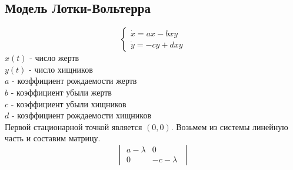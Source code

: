 \subsection{Модель Лотки-Вольтерра}
\begin{equation}
  \begin{cases}
    \dot{x}=ax-bxy\\
    \dot{y}=-cy+dxy
  \end{cases}
\end{equation}
$x(t)$ - число жертв\\
$y(t)$ - число хищников\\
$a$ - коэффициент рождаемости жертв\\
$b$ - коэффициент убыли жертв\\
$c$ - коэффициент убыли хищников \\
$d$ - коэффициент рождаемости хищников\\

Первой стационарной точкой является $(0,0)$. Возьмем из системы линейную часть и составим матрицу.
\begin{equation}
  \begin{vmatrix}
  a-\lambda&0\\0&-c-\lambda\;
\end{vmatrix}
\end{equation}

